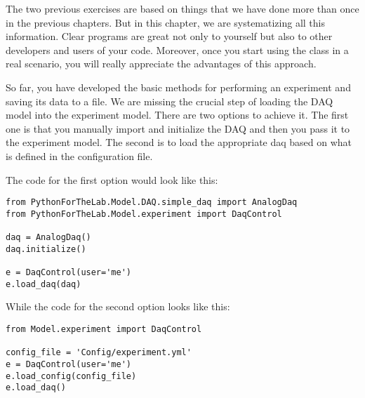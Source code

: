 {

The two previous exercises are based on things that we have done more than once in the previous chapters. But in this chapter, we are systematizing all this information. Clear programs are great not only to yourself but also to other developers and users of your code. Moreover, once you start using the class in a real scenario, you will really appreciate the advantages of this approach.


So far, you have developed the basic methods for performing an experiment and saving its data to a file. We are missing the crucial step of loading the {DAQ} model into the experiment model. There are two options to achieve it. The first one is that you manually import and initialize the {DAQ} and then you pass it to the experiment model. The second is to load the appropriate daq based on what is defined in the configuration file.

The code for the first option would look like this:

\begin{verbatim}
from PythonForTheLab.Model.DAQ.simple_daq import AnalogDaq
from PythonForTheLab.Model.experiment import DaqControl

daq = AnalogDaq()
daq.initialize()

e = DaqControl(user='me')
e.load_daq(daq)
\end{verbatim}

While the code for the second option looks like this:

\begin{verbatim}
from Model.experiment import DaqControl

config_file = 'Config/experiment.yml'
e = DaqControl(user='me')
e.load_config(config_file)
e.load_daq()
\end{verbatim}

}
